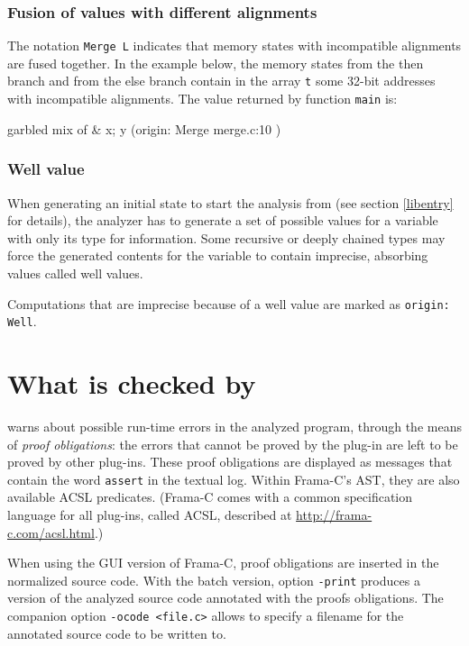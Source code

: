 \documentclass{frama-c-book}
\begin{document}
\subsubsection{Fusion of values with different alignments}
The notation \lstinline$Merge L$ indicates that memory states with incompatible
alignments are fused together. In the example below,
the memory states from
the then branch and from the else branch contain in the array
\lstinline|t| some 32-bit addresses with incompatible alignments.
The value returned by function \lstinline|main| is:

\begin{logsmath}
{{ garbled mix of &{ x; y } (origin: Merge { merge.c:10 }) }}
\end{logsmath}

\subsubsection{Well value}

When generating an initial state to start the analysis from
(see section \ref{libentry} for details), the analyzer
has to generate a set of
possible values for a variable with only its type for information.
Some recursive or deeply chained types may force the generated
contents for the variable to contain imprecise, absorbing values
called well values.

Computations that are imprecise because of a well value are marked
as \lstinline|origin: Well|.

\section{What is checked by \Eva{}}\label{obligations}

\Eva{} warns about possible run-time errors in the analyzed
program, through the means of \emph{proof obligations}: the errors that cannot
be proved by the \Eva{} plug-in are left to be proved by other plug-ins.
These proof obligations
are displayed as messages that contain the word \lstinline|assert| in
the textual log. Within Frama-C's AST, they are also available ACSL predicates.
(Frama-C comes with a common specification language for all plug-ins,
called ACSL, described at \url{http://frama-c.com/acsl.html}.)

When using the GUI version of Frama-C, proof obligations are
inserted in the normalized source code. With the batch version,
option \lstinline|-print| produces a version of the analyzed source code
annotated with the proofs obligations.  The companion option
\lstinline|-ocode <file.c>| allows to specify a filename for the
annotated source code to be written to.
\end{document}
